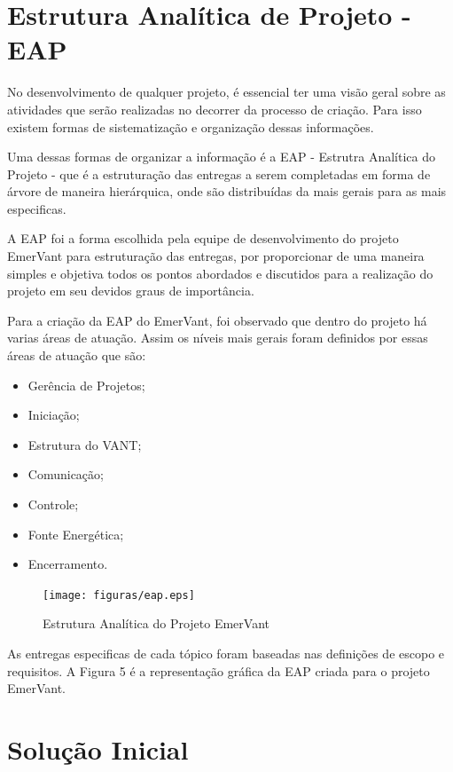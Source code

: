 \section{Estrutura Analítica de Projeto - EAP}

No desenvolvimento de qualquer projeto, é essencial ter uma visão geral sobre as atividades que serão realizadas no decorrer da processo de criação.  Para isso existem formas de sistematização e organização dessas informações.

Uma dessas formas de organizar a informação é a EAP - Estrutra Analítica do Projeto - que é a estruturação das entregas a serem completadas em forma de árvore de maneira hierárquica, onde são distribuídas da mais gerais para as mais especificas.

A EAP foi a forma escolhida pela equipe de desenvolvimento do projeto EmerVant para estruturação das entregas, por proporcionar de uma maneira simples e objetiva todos os pontos abordados e discutidos para a realização do projeto em seu devidos graus de importância. 

Para a criação da EAP do EmerVant, foi observado que dentro do projeto há varias áreas de atuação. Assim os níveis mais gerais foram definidos por essas áreas de atuação que são:
\begin{itemize}
\item Gerência de Projetos;
\item Iniciação;
\item Estrutura do VANT;
\item Comunicação;
\item Controle;
\item Fonte Energética;
\item Encerramento.
\end{itemize}

\begin{figure}[ht]
  \centering
    \texttt{[image: figuras/eap.eps]}
  \caption{Estrutura Analítica do Projeto EmerVant}
\end{figure}

As entregas especificas de cada tópico foram baseadas nas definições de escopo e requisitos. A Figura 5 é a representação gráfica da EAP criada para o projeto EmerVant.

\section{Solução Inicial}

  


